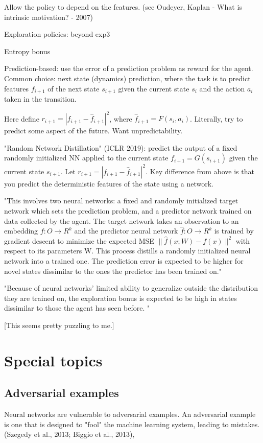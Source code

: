 \documentclass[english]{article}
\begin{document}
Allow the policy to depend on the features. (see Oudeyer, Kaplan - What is intrinsic motivation?  - 2007)

\item Exploration policies: beyond exp3

Entropy bonus

Prediction-based: use the error of a prediction problem as reward for the agent. Common choice: next state (dynamics) prediction, where the task is to predict features $f_{i+1}$ of the next state $s_{i+1}$ given the current state $s_i$ and the action $a_i$ taken in the transition. 

Here define $r_{i+1} = |f_{i+1}-\hat f_{i+1}|^2$, where $\hat f_{i+1} = F(s_{i},a_i)$. Literally, try to predict some aspect of the future. Want unpredictability.


"Random Network Distillation" (ICLR 2019): predict the output of a fixed randomly initialized NN applied to the current state $f_{i+1} = G(s_{i+1})$ given the current state $s_{i+1}$. Let $r_{i+1} = |f_{i+1}-\hat f_{i+1}|^2$. Key difference from above is that you predict the deterministic features of the state using a network. 

"This involves two neural networks: a fixed and randomly initialized target network which sets the
prediction problem, and a predictor network trained on data collected by the agent. The target network
takes an observation to an embedding $f : O \to R^k$ and the predictor neural network $\hat f : O \to R^k$
is trained by gradient descent to minimize the expected MSE $\|\hat f(x;W) − f(x)\|^2$ with respect to its
parameters W. This process distills a randomly initialized neural network into a trained one. The
prediction error is expected to be higher for novel states dissimilar to the ones the predictor has been
trained on."

"Because of neural networks' limited ability to generalize outside the distribution they are trained on, the exploration bonus is expected to be high in states dissimilar to those the agent has seen before. "


[This seems pretty puzzling to me.]


\eenum 

\section{Special topics}
%
\subsection{Adversarial examples}
%
\bitem
\item Neural networks are vulnerable to adversarial examples. An adversarial example is one that is designed to "fool" the machine learning system, leading to mistakes. (Szegedy et al., 2013; Biggio et al., 2013),
\end{document}
